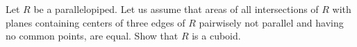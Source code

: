 Let $ R$ be a parallelopiped. Let us assume that areas of all intersections of $ R$ with planes containing centers of three edges of $ R$ pairwisely not parallel and having no common points, are equal. Show that $ R$ is a cuboid.